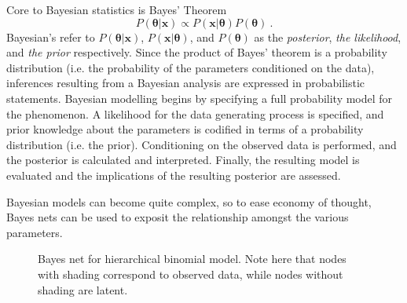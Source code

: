 Core to Bayesian statistics is Bayes' Theorem
%
\begin{equation}\label{Bayes}
	P( \bm{\theta} \vert \mathbf{x}) \propto P(\mathbf{x} \vert \bm{\theta}) P(\bm{\theta}) \>.
\end{equation}
%
Bayesian's refer to $  P( \bm{\theta} \vert \mathbf{x}) $, $ P(\mathbf{x} \vert \bm{\theta})  $, and $P(\bm{\theta})$ as the \textit{posterior}, \textit{the likelihood}, and \textit{the prior} respectively.  Since the product of Bayes' theorem is a probability distribution (i.e. the probability of the parameters conditioned on the data), inferences resulting from a Bayesian analysis are expressed in probabilistic statements. Bayesian modelling begins by specifying a full probability model for the phenomenon.  A likelihood for the data generating process is specified, and prior knowledge about the parameters is codified in terms of a probability distribution (i.e. the prior).  Conditioning on the observed data is performed, and the posterior is calculated and interpreted.  Finally, the resulting model is evaluated and the implications of the resulting posterior are assessed.

Bayesian models can become quite complex, so to ease economy of thought, Bayes nets can be used to exposit the relationship amongst the various parameters.

\begin{figure}[h!]\label{bayesnet}
	\centering
	\caption{Bayes net for hierarchical binomial model.  Note here that nodes with shading correspond to observed data, while nodes without shading are latent.}
\end{figure}


